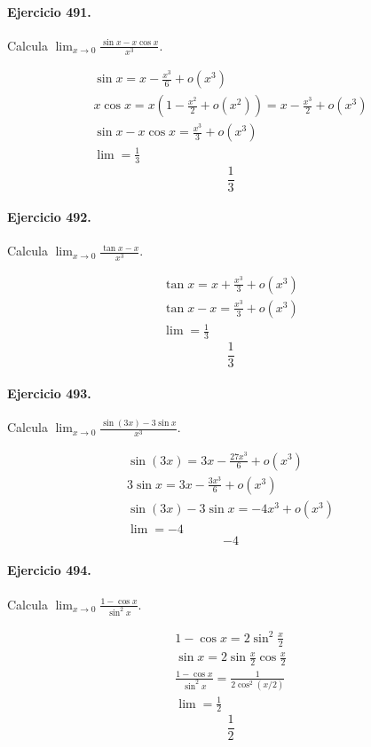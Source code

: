 \documentclass[11pt,a4paper]{article}
\begin{document}
\paragraph{Ejercicio 491.} Calcula $\displaystyle \lim_{x\to0}\frac{\sin x-x\cos x}{x^3}$.

\[
\begin{aligned}
\sin x=x-\frac{x^3}{6}+o(x^3)\\
x\cos x=x\left(1-\frac{x^2}{2}+o(x^2)\right)=x-\frac{x^3}{2}+o(x^3)\\
\sin x-x\cos x=\frac{x^3}{3}+o(x^3)\\
\lim=\frac13
\end{aligned}
\]
\[\boxed{\frac13}\]


\paragraph{Ejercicio 492.} Calcula $\displaystyle \lim_{x\to0}\frac{\tan x-x}{x^3}$.

\[
\begin{aligned}
\tan x=x+\frac{x^3}{3}+o(x^3)\\
\tan x-x=\frac{x^3}{3}+o(x^3)\\
\lim=\frac13
\end{aligned}
\]
\[\boxed{\frac13}\]


\paragraph{Ejercicio 493.} Calcula $\displaystyle \lim_{x\to0}\frac{\sin(3x)-3\sin x}{x^3}$.

\[
\begin{aligned}
\sin(3x)=3x-\frac{27x^3}{6}+o(x^3)\\
3\sin x=3x-\frac{3x^3}{6}+o(x^3)\\
\sin(3x)-3\sin x=-4x^3+o(x^3)\\
\lim=-4
\end{aligned}
\]
\[\boxed{-4}\]


\paragraph{Ejercicio 494.} Calcula $\displaystyle \lim_{x\to0}\frac{1-\cos x}{\sin^2x}$.

\[
\begin{aligned}
1-\cos x=2\sin^2\frac{x}{2}\\
\sin x=2\sin\frac{x}{2}\cos\frac{x}{2}\\
\frac{1-\cos x}{\sin^2x}=\frac{1}{2\cos^2(x/2)}\\
\lim=\frac12
\end{aligned}
\]
\[\boxed{\frac12}\]
\end{document}
